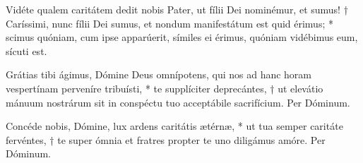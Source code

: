 \vspace{0.6cm}

Vidéte qualem caritátem dedit nobis Pater, ut fílii Dei nominémur, et sumus! † Caríssimi, nunc fílii Dei sumus, et nondum manifestátum est quid érimus; 
* scimus quóniam, cum ipse apparúerit, símiles ei érimus, quóniam vidébimus eum, sícuti est.\\




\vspace{0.6cm}


\vspace{0.6cm}



\vspace{0.6cm}

\def\greinitialformat#1{{\fontsize{40}{40}\selectfont #1}}
\gresetfirstlineaboveinitial{\small \textcolor{red}{Magni.}}{}
\setaboveinitialseparation{0.72mm}







Grátias tibi ágimus, Dómine Deus omnípotens, qui nos ad hanc horam vespertínam perveníre tribuísti, 
* te supplíciter deprecántes, † ut elevátio mánuum nostrárum sit in conspéctu tuo acceptábile sacrifícium. Per Dóminum.

Concéde nobis, Dómine, lux ardens caritátis ætérnæ, * ut tua semper caritáte fervéntes, 
† te super ómnia et fratres propter te uno diligámus amóre. Per Dóminum.